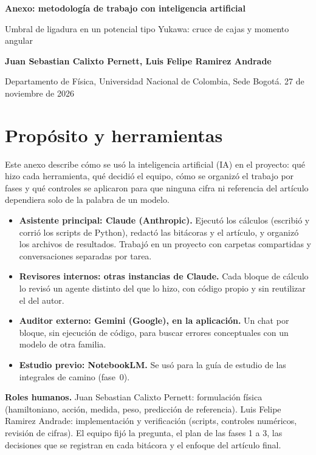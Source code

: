 \documentclass[10pt,letterpaper]{article}
\begin{document}
\begin{flushleft}
{\sffamily\bfseries\Large Anexo: metodología de trabajo con inteligencia artificial\par}
\vspace{3pt}
{\sffamily\normalsize Umbral de ligadura en un potencial tipo Yukawa: cruce de cajas y momento angular\par}
\vspace{4pt}
{\sffamily\bfseries\small Juan Sebastian Calixto Pernett, Luis Felipe Ramirez Andrade\par}
{\sffamily\footnotesize Departamento de Física, Universidad Nacional de Colombia, Sede Bogotá. 27 de noviembre de 2026\par}
\end{flushleft}

\section{Propósito y herramientas}

Este anexo describe cómo se usó la inteligencia artificial (IA) en el proyecto: qué hizo cada herramienta, qué decidió el equipo, cómo se organizó el trabajo por fases y qué controles se aplicaron para que ninguna cifra ni referencia del artículo dependiera solo de la palabra de un modelo.

\begin{itemize}[leftmargin=*]
\item \textbf{Asistente principal: Claude (Anthropic).} Ejecutó los cálculos (escribió y corrió los scripts de Python), redactó las bitácoras y el artículo, y organizó los archivos de resultados. Trabajó en un proyecto con carpetas compartidas y conversaciones separadas por tarea.
\item \textbf{Revisores internos: otras instancias de Claude.} Cada bloque de cálculo lo revisó un agente distinto del que lo hizo, con código propio y sin reutilizar el del autor.
\item \textbf{Auditor externo: Gemini (Google), en la aplicación.} Un chat por bloque, sin ejecución de código, para buscar errores conceptuales con un modelo de otra familia.
\item \textbf{Estudio previo: NotebookLM.} Se usó para la guía de estudio de las integrales de camino (fase~0).
\end{itemize}

\textbf{Roles humanos.} Juan Sebastian Calixto Pernett: formulación física (hamiltoniano, acción, medida, peso, predicción de referencia). Luis Felipe Ramirez Andrade: implementación y verificación (scripts, controles numéricos, revisión de cifras). El equipo fijó la pregunta, el plan de las fases 1 a 3, las decisiones que se registran en cada bitácora y el enfoque del artículo final.
\end{document}
